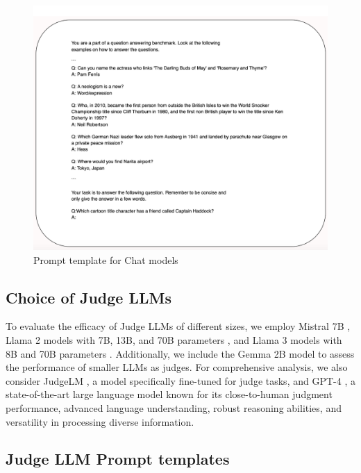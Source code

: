 \begin{figure}[H]
    \centering
    \centering
    \includegraphics[width=\linewidth]{figures/Chat_prompt_template.png}
    \caption{Prompt template for Chat models}
    \label{app:template_finetuned}
\end{figure}


\subsection{Choice of Judge LLMs}
\label{app:judgeLLM_details}

To evaluate the efficacy of Judge LLMs of different sizes, we employ Mistral 7B \citep{jiang2023mistral}, Llama 2 models with 7B, 13B, and 70B parameters \citep{touvron2023llama}, and Llama 3 models with 8B and 70B parameters \citep{meta2024llama3}. Additionally, we include the Gemma 2B model \citep{gemma2024gemma} to assess the performance of smaller LLMs as judges. For comprehensive analysis, we also consider JudgeLM \citep{judgelm}, a model specifically fine-tuned for judge tasks, and GPT-4 \citep{openai2024gpt4}, a state-of-the-art large language model known for its close-to-human judgment performance, advanced language understanding, robust reasoning abilities, and versatility in processing diverse information.

\subsection{Judge LLM Prompt templates}\label{app:judge-prompt-template}

